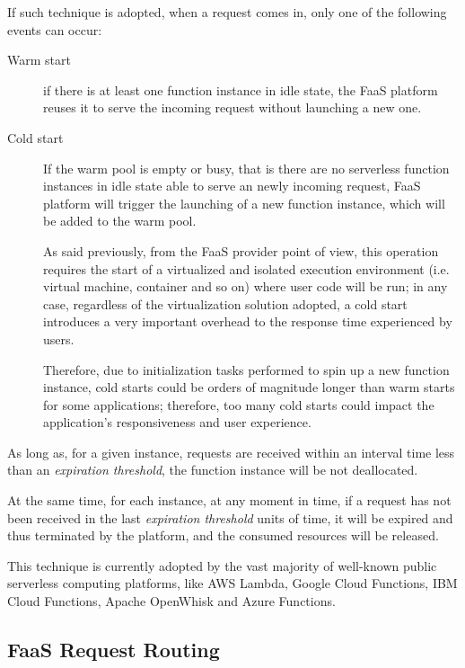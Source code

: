 \documentclass[12pt,a4paper]{report}
\theoremstyle{definition}
\begin{document}
If such technique is adopted, when a request comes in, only one of the following events can occur:

\begin{description}
	
	\item[Warm start] if there is at least one function instance in idle state, the FaaS platform reuses it to serve the incoming request without launching a new one.
	
	\item[Cold start] If the warm pool is empty or busy, that is there are no serverless function instances in idle state able to serve an newly incoming request, FaaS platform will trigger the launching of a new function instance, which will be added to the warm pool.
	
	As said previously, from the FaaS provider point of view, this operation requires the start of a virtualized and isolated execution environment (i.e. virtual machine, container and so on) where user code will be run; in any case, regardless of the virtualization solution adopted, a cold start introduces a very important overhead to the response time experienced by users. 
	
	Therefore, due to initialization tasks performed to spin up a new function instance, cold starts could be orders of magnitude longer than warm starts for some applications; therefore, too many cold starts could impact the application’s responsiveness and user experience.
\end{description} 

As long as, for a given instance, requests are received within an interval time less than an \textit{expiration threshold}, the function instance will be not deallocated.

At the same time, for each instance, at any moment in time, if a request has not been received in the last \textit{expiration threshold} units of time, it will be expired and thus terminated by the platform, and the consumed resources will be released. 

This technique is currently adopted by the vast majority of well-known public serverless computing platforms, like AWS Lambda, Google Cloud Functions, IBM Cloud Functions, Apache OpenWhisk and Azure Functions. 

\subsection{FaaS Request Routing}
\end{document}
